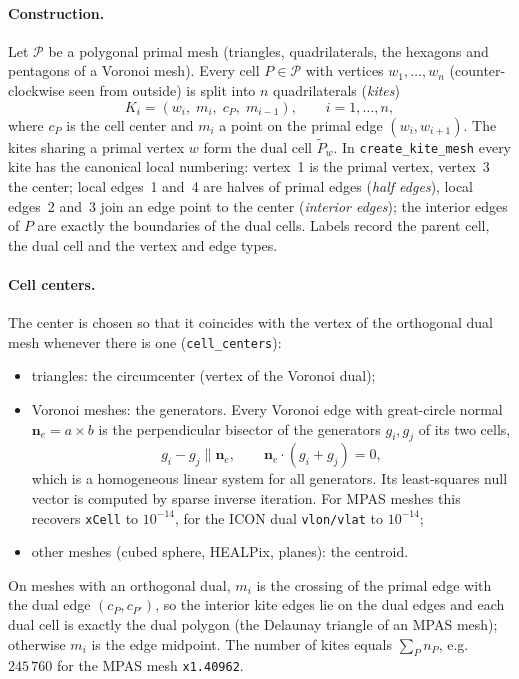 \documentclass[11pt,a4paper]{article}
\newcommand{\bn}{\mathbf{n}}
\newcommand{\Pc}{\mathcal{P}}
\newcommand{\code}[1]{\texttt{#1}}
\begin{document}
\paragraph{Construction.} Let $\Pc$ be a polygonal primal mesh (triangles,
quadrilaterals, the hexagons and pentagons of a Voronoi mesh). Every cell
$P\in\Pc$ with vertices $w_1,\dots,w_n$ (counter-clockwise seen from outside)
is split into $n$ quadrilaterals (\emph{kites})
\[
  K_i = (w_i,\; m_i,\; c_P,\; m_{i-1}),\qquad i = 1,\dots,n,
\]
where $c_P$ is the cell center and $m_i$ a point on the primal edge
$(w_i,w_{i+1})$. The kites sharing a primal vertex $w$ form the dual cell
$\widetilde P_w$. In \code{create\_kite\_mesh} every kite has the canonical
local numbering: vertex~1 is the primal vertex, vertex~3 the center; local
edges~1 and~4 are halves of primal edges (\emph{half edges}), local edges~2
and~3 join an edge point to the center (\emph{interior edges}); the interior
edges of $P$ are exactly the boundaries of the dual cells. Labels record the
parent cell, the dual cell and the vertex and edge types.

\paragraph{Cell centers.} The center is chosen so that it coincides with the
vertex of the orthogonal dual mesh whenever there is one
(\code{cell\_centers}):
\begin{itemize}
\item triangles: the circumcenter (vertex of the Voronoi dual);
\item Voronoi meshes: the generators. Every Voronoi edge with great-circle
  normal $\bn_e = a\times b$ is the perpendicular bisector of the generators
  $g_i, g_j$ of its two cells,
  \begin{equation}
    g_i - g_j \parallel \bn_e, \qquad \bn_e\cdot(g_i + g_j) = 0,
  \end{equation}
  which is a homogeneous linear system for all generators. Its least-squares
  null vector is computed by sparse inverse iteration. For MPAS meshes this
  recovers \code{xCell} to $10^{-14}$, for the ICON dual \code{vlon/vlat}
  to $10^{-14}$;
\item other meshes (cubed sphere, HEALPix, planes): the centroid.
\end{itemize}
On meshes with an orthogonal dual, $m_i$ is the crossing of the primal edge with
the dual edge $(c_P, c_{P'})$, so the interior kite edges lie on the dual edges
and each dual cell is exactly the dual polygon (the Delaunay triangle of an MPAS
mesh); otherwise $m_i$ is the edge midpoint. The number of kites equals
$\sum_P n_P$, e.g.\ $245\,760$ for the MPAS mesh \code{x1.40962}.
\end{document}
